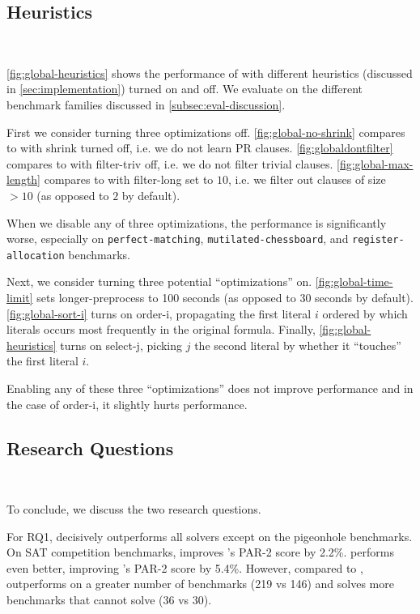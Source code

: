 \subsection{Heuristics}~\label{sec:heuristics}

\autoref{fig:global-heuristics} shows the performance of \tool with different
heuristics (discussed in \autoref{sec:implementation}) turned on and off. We
evaluate on the different benchmark families discussed in
\autoref{subsec:eval-discussion}.

First we consider turning three optimizations off.
\autoref{fig:global-no-shrink} compares \tool to \tool with
\textsf{shrink} turned off, i.e. we do not learn PR clauses.
\autoref{fig:globaldontfilter} compares \tool to \tool with
\textsf{filter-triv} off, i.e. we do not filter trivial clauses.
\autoref{fig:global-max-length} compares \tool to \tool with
\textsf{filter-long} set to $10$, i.e. we filter out clauses of size $> 10$ (as
opposed to $2$ by default).

When we disable any of three optimizations, the performance is significantly
worse, especially on \texttt{perfect-matching}, \texttt{mutilated-chessboard},
and \texttt{register-allocation} benchmarks.

Next, we consider turning three potential ``optimizations'' on.
\autoref{fig:global-time-limit} sets \textsf{longer-preprocess} to 100 seconds
(as opposed to 30 seconds by default). \autoref{fig:global-sort-i} turns on
\textsf{order-i}, propagating the first literal $i$ ordered by which literals
occurs most frequently in the original formula. Finally,
\autoref{fig:global-heuristics} turns on \textsf{select-j}, picking $j$ the
second literal by whether it ``touches'' the first literal $i$.

Enabling any of these three ``optimizations'' does not improve performance and
in the case of \textsf{order-i}, it slightly hurts performance.

\subsection{Research Questions}~\label{subsec:researchquestions}

To conclude, we discuss the two research questions. 

For RQ1, \tool decisively outperforms all solvers except \sadical on the
pigeonhole benchmarks. On SAT competition benchmarks, \tool improves \cadical's
PAR-2 score by 2.2\%. \prelearn performs even better, improving \cadical's PAR-2
score by 5.4\%. However, compared to \prelearn, \tool outperforms \cadical on a
greater number of benchmarks (219 vs 146) and solves more benchmarks that
\cadical cannot solve (36 vs 30).

